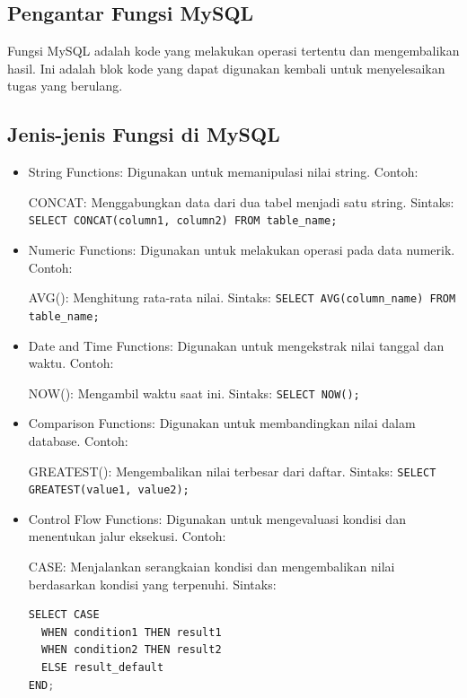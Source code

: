 \documentclass{article}
\begin{document}
\subsection{Pengantar Fungsi MySQL}
Fungsi MySQL adalah kode yang melakukan operasi tertentu dan mengembalikan hasil. Ini adalah blok kode yang dapat digunakan kembali untuk menyelesaikan tugas yang berulang.

\subsection{Jenis-jenis Fungsi di MySQL}
\begin{itemize}
      \item String Functions: Digunakan untuk memanipulasi nilai string. Contoh:

            CONCAT: Menggabungkan data dari dua tabel menjadi satu string. Sintaks: \verb|SELECT CONCAT(column1, column2) FROM table_name;|

      \item Numeric Functions: Digunakan untuk melakukan operasi pada data numerik. Contoh:

            AVG(): Menghitung rata-rata nilai.
            Sintaks: \verb|SELECT AVG(column_name) FROM table_name;|

      \item Date and Time Functions: Digunakan untuk mengekstrak nilai tanggal dan waktu. Contoh:

            NOW(): Mengambil waktu saat ini.
            Sintaks: \verb|SELECT NOW();|

      \item Comparison Functions: Digunakan untuk membandingkan nilai dalam database. Contoh:

            GREATEST(): Mengembalikan nilai terbesar dari daftar.
            Sintaks: \verb|SELECT GREATEST(value1, value2);|

      \item Control Flow Functions: Digunakan untuk mengevaluasi kondisi dan menentukan jalur eksekusi. Contoh:

            CASE: Menjalankan serangkaian kondisi dan mengembalikan nilai berdasarkan kondisi yang terpenuhi.
            Sintaks:
            \begin{lstlisting}[language=Python, caption={}, captionpos=b]
SELECT CASE 
  WHEN condition1 THEN result1
  WHEN condition2 THEN result2
  ELSE result_default
END;
\end{lstlisting}
\end{itemize}
\end{document}
